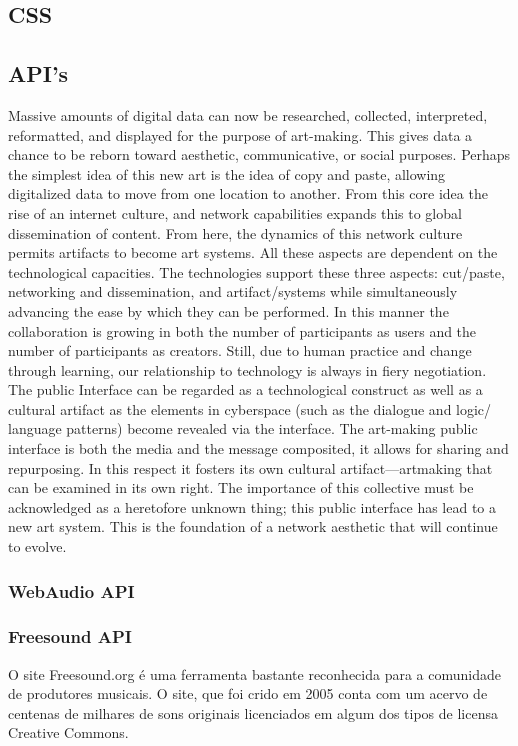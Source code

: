 \subsection{CSS}

\subsection{API's}
\begin{citacao}
Massive amounts of digital data can now be researched, collected, interpreted, reformatted, and displayed for the purpose of art-making. This gives data a chance to be reborn toward aesthetic, communicative, or social purposes. Perhaps the simplest idea of this new art is the idea of copy and paste, allowing digitalized data to move from one location to another. From this core idea the rise of an internet culture, and network capabilities expands this to global dissemination of content. From here, the dynamics of this network culture permits artifacts to become art systems. All these aspects are dependent on the technological capacities. The technologies support these three aspects: cut/paste, networking and dissemination, and artifact/systems while simultaneously advancing the ease by which they can be performed. In this manner the collaboration is growing in both the number of participants as users and the number of participants as creators. Still, due to human practice and change through learning, our relationship to technology is always in fiery negotiation. The public Interface can be regarded as a technological construct as well as a cultural artifact as the elements in cyberspace (such as the dialogue and logic/ language patterns) become revealed via the interface. The art-making public interface is both the media and the message composited, it allows for sharing and repurposing. In this respect it fosters its own cultural artifact—artmaking that can be examined in its own right. The importance of this collective must be acknowledged as a heretofore unknown thing; this public interface has lead to a new art system. This is the foundation of a network aesthetic that will continue to evolve.
\cite[5]{Soon2011}
\end{citacao}

\subsubsection{WebAudio API}

\subsubsection{Freesound API}
O site Freesound.org \cite{Font2013} é uma ferramenta bastante reconhecida para a comunidade de produtores musicais. O site, que foi crido em 2005 conta com um acervo de centenas de milhares de sons originais licenciados em algum dos tipos de licensa Creative Commons. 


